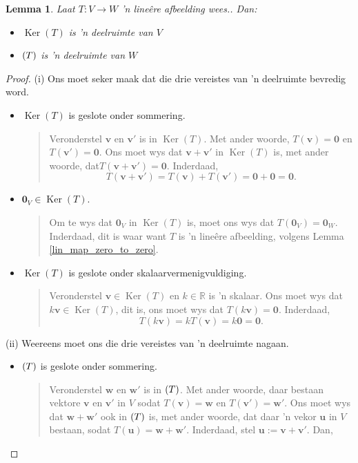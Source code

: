 \documentclass[a4paper,11pt]{book}
\newtheorem{lemma}[theorem]{Lemma}
\theoremstyle{definition}
\newcommand{\ve}[1]{\mathbf{#1}}
\DeclareMathOperator{\Ker}{Ker}
\let\Im\relax
\DeclareMathOperator{\Im}{Im} %
\begin{document}
\begin{lemma}\label{ker-im-subspace} Laat $T : V \rightarrow W$ 'n
	line{\^e}re afbeelding wees..
	Dan:
	\begin{itemize}
		\item[(i)] $\Ker(T)$ is 'n deelruimte van $V$
		\item[(ii)] $\Im(T)$ is 'n deelruimte van $W$
	\end{itemize} 
\end{lemma}
\begin{proof} (i) Ons moet seker maak dat die drie vereistes van 'n
	deelruimte bevredig word.
	\begin{itemize}
		\item[a.] $\Ker(T)$ is geslote onder sommering.
			\begin{quote} Veronderstel $\ve{v}$ en $\ve{v}'$ is in
				$\Ker(T)$. Met ander woorde, $T(\ve{v}) = \ve{0}$ en
				$T(\ve{v}') = \ve{0}$. Ons moet wys dat $\ve{v} + \ve{v}'$
				in $\Ker(T)$ is, met ander woorde, dat$T(\ve{v} + \ve{v}')
				= \ve{0}$. Inderdaad,
				\[
					T(\ve{v} + \ve{v}') = T(\ve{v}) + T(\ve{v}') = \ve{0} +
					\ve{0} = \ve{0}.
				\]
			\end{quote}
		\item[b.] $\ve{0}_V \in \Ker(T)$.
			\begin{quote}
				Om te wys dat $\ve{0}_V$ in $\Ker(T)$ is, moet ons wys dat
				$T(\ve{0}_V) = \ve{0}_W$. Inderdaad, dit is waar want $T$
				is 'n line{\^e}re afbeelding, volgens Lemma
				\ref{lin_map_zero_to_zero}. 
			\end{quote}
		\item[c.] $\Ker(T)$ is geslote onder skalaarvermenigvuldiging. 
			\begin{quote} Veronderstel $\ve{v} \in \Ker(T)$ en $k \in
				\mathbb{R}$ is 'n skalaar. Ons moet wys dat $k \ve{v} \in
				\Ker(T)$, dit is, ons moet wys dat $T(k \ve{v}) = \ve{0}$.
				Inderdaad,
				\[
					T(k \ve{v}) = k T(\ve{v}) = k \ve{0} = \ve{0}.
				\]
			\end{quote}
	\end{itemize}

	\noindent (ii) Weereens moet ons die drie vereistes van 'n deelruimte
	nagaan.
	\begin{itemize}
		\item[a.] $\Im(T)$ is geslote onder sommering.
			\begin{quote}
				Veronderstel $\ve{w}$ en $\ve{w}'$ is in $\Im(T)$. Met
				ander woorde, daar bestaan vektore $\ve{v}$ en $\ve{v}'$ in
				$V$ sodat $T(\ve{v}) = \ve{w}$ en $T(\ve{v}') = \ve{w}'$.
				Ons moet wys dat $\ve{w} + \ve{w}'$ ook in $\Im(T)$ is, met
				ander woorde, dat daar 'n vekor $\ve{u}$ in $V$ bestaan,
				sodat $T(\ve{u}) = \ve{w} + \ve{w}'$. Inderdaad, stel
				$\ve{u} := \ve{v} + \ve{v}'$. Dan,


\end{quote}
\end{itemize}
\end{proof}
\end{document}
